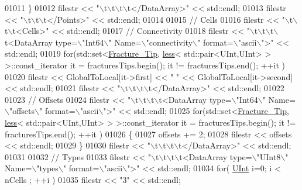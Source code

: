 \begin{DoxyCode}
01011     \}
01012     filestr << \textcolor{stringliteral}{"\(\backslash\)t\(\backslash\)t\(\backslash\)t\(\backslash\)t</DataArray>"} << std::endl;
01013     filestr << \textcolor{stringliteral}{"\(\backslash\)t\(\backslash\)t\(\backslash\)t</Points>"} << std::endl;
01014 
01015     \textcolor{comment}{// Cells}
01016     filestr << \textcolor{stringliteral}{"\(\backslash\)t\(\backslash\)t\(\backslash\)t<Cells>"} << std::endl;
01017     \textcolor{comment}{//  Connectivity}
01018     filestr << \textcolor{stringliteral}{"\(\backslash\)t\(\backslash\)t\(\backslash\)t\(\backslash\)t<DataArray type=\(\backslash\)"Int64\(\backslash\)" Name=\(\backslash\)"connectivity\(\backslash\)" format=\(\backslash\)"ascii\(\backslash\)">"} << std::endl;
01019     \textcolor{keywordflow}{for}(std::set<\hyperlink{classFVCode3D_1_1Exporter_a0b32ca80de98d8d633485ef5c0f537bb}{Fracture\_Tip}, \hyperlink{structFVCode3D_1_1less}{less}< std::pair<UInt,UInt> > >::const\_iterator it = 
      fracturesTips.begin(); it != fracturesTips.end(); ++it )
01020         filestr << GlobalToLocal[it->first] << \textcolor{stringliteral}{" "} << GlobalToLocal[it->second] << std::endl;
01021     filestr << \textcolor{stringliteral}{"\(\backslash\)t\(\backslash\)t\(\backslash\)t\(\backslash\)t</DataArray>"} << std::endl;
01022 
01023     \textcolor{comment}{//  Offsets}
01024     filestr << \textcolor{stringliteral}{"\(\backslash\)t\(\backslash\)t\(\backslash\)t\(\backslash\)t<DataArray type=\(\backslash\)"Int64\(\backslash\)" Name=\(\backslash\)"offsets\(\backslash\)" format=\(\backslash\)"ascii\(\backslash\)">"} << std::endl;
01025     \textcolor{keywordflow}{for}(std::set<\hyperlink{classFVCode3D_1_1Exporter_a0b32ca80de98d8d633485ef5c0f537bb}{Fracture\_Tip}, \hyperlink{structFVCode3D_1_1less}{less}< std::pair<UInt,UInt> > >::const\_iterator it = 
      fracturesTips.begin(); it != fracturesTips.end(); ++it )
01026     \{
01027         offsets += 2;
01028         filestr << offsets << std::endl;
01029     \}
01030     filestr << \textcolor{stringliteral}{"\(\backslash\)t\(\backslash\)t\(\backslash\)t\(\backslash\)t</DataArray>"} << std::endl;
01031 
01032     \textcolor{comment}{//  Types}
01033     filestr << \textcolor{stringliteral}{"\(\backslash\)t\(\backslash\)t\(\backslash\)t\(\backslash\)t<DataArray type=\(\backslash\)"UInt8\(\backslash\)" Name=\(\backslash\)"types\(\backslash\)" format=\(\backslash\)"ascii\(\backslash\)">"} << std::endl;
01034     \textcolor{keywordflow}{for}( \hyperlink{namespaceFVCode3D_a4bf7e328c75d0fd504050d040ebe9eda}{UInt} i=0; i < nCells ; ++i )
01035         filestr << \textcolor{stringliteral}{"3"} << std::endl;

\end{DoxyCode}

